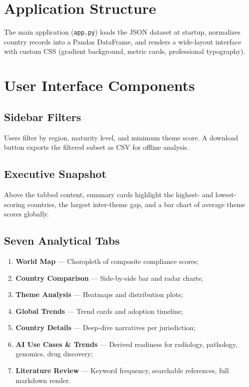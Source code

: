 \documentclass[12pt,a4paper]{report}
\begin{document}
\section{Application Structure}

The main application (\texttt{app.py}) loads the JSON dataset at startup, normalizes country records into a Pandas DataFrame, and renders a wide-layout interface with custom CSS (gradient background, metric cards, professional typography).

\section{User Interface Components}

\subsection{Sidebar Filters}

Users filter by region, maturity level, and minimum theme score. A download button exports the filtered subset as CSV for offline analysis.

\subsection{Executive Snapshot}

Above the tabbed content, summary cards highlight the highest- and lowest-scoring countries, the largest inter-theme gap, and a bar chart of average theme scores globally.

\subsection{Seven Analytical Tabs}

\begin{enumerate}[noitemsep]
  \item \textbf{World Map} --- Choropleth of composite compliance scores;
  \item \textbf{Country Comparison} --- Side-by-side bar and radar charts;
  \item \textbf{Theme Analysis} --- Heatmaps and distribution plots;
  \item \textbf{Global Trends} --- Trend cards and adoption timeline;
  \item \textbf{Country Details} --- Deep-dive narratives per jurisdiction;
  \item \textbf{AI Use Cases \& Trends} --- Derived readiness for radiology, pathology, genomics, drug discovery;
  \item \textbf{Literature Review} --- Keyword frequency, searchable references, full markdown render.
\end{enumerate}
\end{document}

